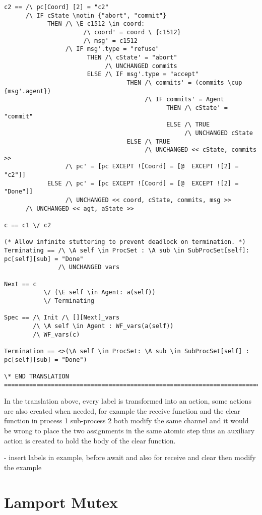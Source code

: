 \documentclass{thesul}
\begin{document}
\begin{appendices}
\begin{lstlisting}[caption = TLA+ translation for Sub-Processes, frame = tlrb, firstnumber = 1]
c2 == /\ pc[Coord] [2] = "c2"
      /\ IF cState \notin {"abort", "commit"}
            THEN /\ \E c1512 \in coord:
                      /\ coord' = coord \ {c1512}
                      /\ msg' = c1512
                 /\ IF msg'.type = "refuse"
                       THEN /\ cState' = "abort"
                            /\ UNCHANGED commits
                       ELSE /\ IF msg'.type = "accept"
                                  THEN /\ commits' = (commits \cup {msg'.agent})
                                       /\ IF commits' = Agent
                                             THEN /\ cState' = "commit"
                                             ELSE /\ TRUE
                                                  /\ UNCHANGED cState
                                  ELSE /\ TRUE
                                       /\ UNCHANGED << cState, commits >>
                 /\ pc' = [pc EXCEPT ![Coord] = [@  EXCEPT ![2] = "c2"]]
            ELSE /\ pc' = [pc EXCEPT ![Coord] = [@  EXCEPT ![2] = "Done"]]
                 /\ UNCHANGED << coord, cState, commits, msg >>
      /\ UNCHANGED << agt, aState >>

c == c1 \/ c2

(* Allow infinite stuttering to prevent deadlock on termination. *)
Terminating == /\ \A self \in ProcSet : \A sub \in SubProcSet[self]: pc[self][sub] = "Done"
               /\ UNCHANGED vars

Next == c
           \/ (\E self \in Agent: a(self))
           \/ Terminating

Spec == /\ Init /\ [][Next]_vars
        /\ \A self \in Agent : WF_vars(a(self))
        /\ WF_vars(c)

Termination == <>(\A self \in ProcSet: \A sub \in SubProcSet[self] : pc[self][sub] = "Done")

\* END TRANSLATION
=============================================================================

\end{lstlisting}

In the translation above, every label is transformed into an action, some actions are also created when needed, for example the receive function and the clear function in process 1 sub-process 2 both modify the same channel and it would be wrong to place the two assignments in the same atomic step thus an auxiliary action is created to hold the body of the clear function.

- insert labels in example, before await and also for receive and clear then modify the example


\section{Lamport Mutex}

\end{appendices}



\end{document}
